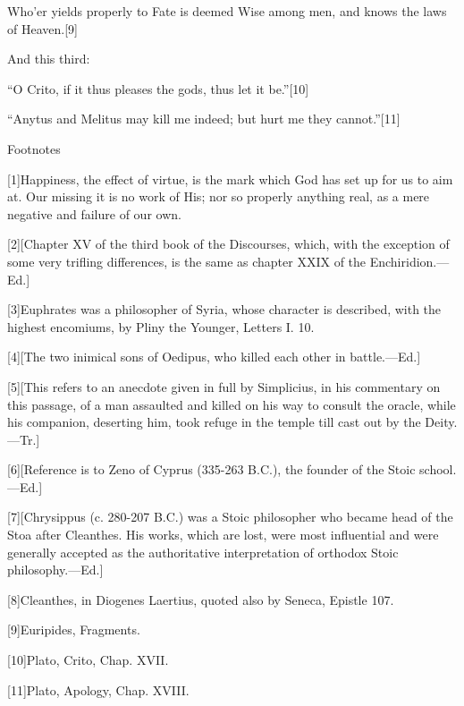 \documentclass[a4paper]{article}
\begin{document}
  Who’er yields properly to Fate is deemed
  Wise among men, and knows the laws of Heaven.[9]

And this third:

  “O Crito, if it thus pleases the gods, thus let it be.”[10]

  “Anytus and Melitus may kill me indeed; but hurt me they cannot.”[11]




                               Footnotes


[1]Happiness, the effect of virtue, is the mark which God has set up for
   us to aim at. Our missing it is no work of His; nor so properly
   anything real, as a mere negative and failure of our own.

[2][Chapter XV of the third book of the Discourses, which, with the
   exception of some very trifling differences, is the same as chapter
   XXIX of the Enchiridion.—Ed.]

[3]Euphrates was a philosopher of Syria, whose character is described,
   with the highest encomiums, by Pliny the Younger, Letters I. 10.

[4][The two inimical sons of Oedipus, who killed each other in
   battle.—Ed.]

[5][This refers to an anecdote given in full by Simplicius, in his
   commentary on this passage, of a man assaulted and killed on his way
   to consult the oracle, while his companion, deserting him, took refuge
   in the temple till cast out by the Deity.—Tr.]

[6][Reference is to Zeno of Cyprus (335-263 B.C.), the founder of the
   Stoic school.—Ed.]

[7][Chrysippus (c. 280-207 B.C.) was a Stoic philosopher who became
   head of the Stoa after Cleanthes. His works, which are lost, were most
   influential and were generally accepted as the authoritative
   interpretation of orthodox Stoic philosophy.—Ed.]

[8]Cleanthes, in Diogenes Laertius, quoted also by Seneca, Epistle 107.

[9]Euripides, Fragments.

[10]Plato, Crito, Chap. XVII.

[11]Plato, Apology, Chap. XVIII.
\end{document}
